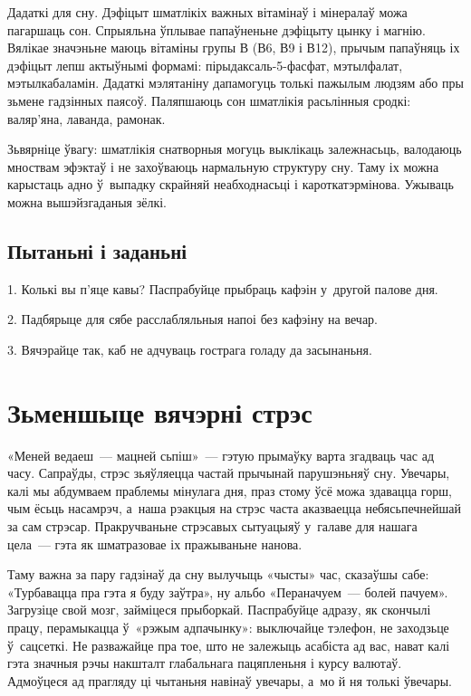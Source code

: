 Дадаткі для сну. Дэфіцыт шматлікіх важных вітамінаў і мінералаў можа пагаршаць сон. Спрыяльна ўплывае папаўненьне дэфіцыту цынку і магнію. Вялікае значэньне маюць вітаміны групы В (В6, В9 і В12), прычым папаўняць іх дэфіцыт лепш актыўнымі формамі: пірыдаксаль-5-фасфат, мэтылфалат, мэтылкабаламін. Дадаткі мэлятаніну дапамогуць толькі пажылым людзям або пры зьмене гадзінных паясоў. Паляпшаюць сон шматлікія расьлінныя сродкі: валяр'яна, лаванда, рамонак.

Зьвярніце ўвагу: шматлікія снатворныя могуць выклікаць залежнасьць, валодаюць мноствам эфэктаў і не захоўваюць нармальную структуру сну. Таму іх можна карыстаць адно ў~выпадку скрайняй неабходнасьці і кароткатэрмінова. Ужываць можна вышэйзгаданыя зёлкі.

\subsection*{Пытаньні і заданьні}

1. Колькі вы п'яце кавы? Паспрабуйце прыбраць кафэін у~другой палове дня.

2. Падбярыце для сябе расслабляльныя напоі без кафэіну на вечар.

3. Вячэрайце так, каб не адчуваць гострага голаду да засынаньня.


\section{Зьменшыце вячэрні стрэс}

«Меней ведаеш~--- мацней сьпіш»~--- гэтую прымаўку варта згадваць час ад часу. Сапраўды, стрэс зьяўляецца частай прычынай парушэньняў сну. Увечары, калі мы абдумваем праблемы мінулага дня, праз стому ўсё можа здавацца горш, чым ёсьць насамрэч, а~наша рэакцыя на стрэс часта аказваецца небясьпечнейшай за сам стрэсар. Пракручваньне стрэсавых сытуацыяў у~галаве для нашага цела~--- гэта як шматразовае іх пражываньне нанова.

Таму важна за пару гадзінаў да сну вылучыць «чысты» час, сказаўшы сабе: «Турбавацца пра гэта я буду заўтра», ну альбо «Пераначуем~--- болей пачуем». Загрузіце свой мозг, займіцеся прыборкай. Паспрабуйце адразу, як скончылі працу, перамыкацца ў~«рэжым адпачынку»: выключайце тэлефон, не заходзьце ў~сацсеткі. Не разважайце пра тое, што не залежыць асабіста ад вас, нават калі гэта значныя рэчы накшталт глабальнага пацяпленьня і курсу валютаў. Адмоўцеся ад прагляду ці чытаньня навінаў увечары, а~мо й ня толькі ўвечары.

